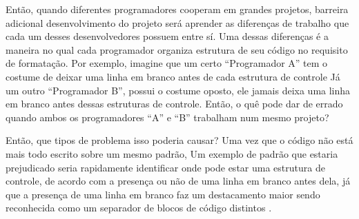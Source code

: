 {    Então,
    quando diferentes programadores cooperam em grandes projetos,
      barreira adicional  desenvolvimento do projeto
    será aprender as diferenças de trabalho que cada um desses desenvolvedores possuem entre sí.
    Uma dessas diferenças é a maneira no qual cada programador
    organiza estrutura de seu código no requisito de formatação.
    Por exemplo,
    imagine que um certo ``Programador A'' tem o costume de deixar uma linha em
    branco antes de cada estrutura de controle Já um outro ``Programador B'',
    possui o costume oposto,
    ele jamais deixa uma linha em branco antes dessas estruturas de controle.
    Então,
    o quê pode dar de errado quando ambos os programadores ``A'' e
    ``B'' trabalham num mesmo projeto?

     Então,
    que tipos de problema isso poderia causar?
    Uma vez que o código não está mais todo escrito sobre um mesmo padrão,
    Um exemplo de padrão que estaria prejudicado
    seria rapidamente identificar onde pode estar uma estrutura de controle,
     de acordo com a presença ou não de uma linha em branco antes dela,
    já que a presença de uma linha em branco faz um destacamento maior sendo reconhecida
    como um separador de blocos de código distintos \cite{aPrettyGoodFormatting}.
}

